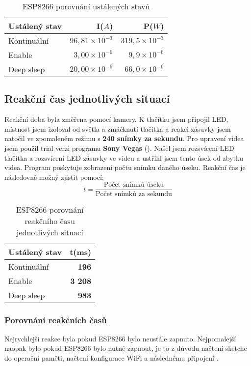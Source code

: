 \documentclass[a4paper, 12pt]{report}
\begin{document}
					\begin{table}[h]
						\centering
						\caption{ESP8266 porovnání ustálených stavů}
						\begin{tabular}{||l|r r||}
							\hline
							Ustálený stav & I($A$) & P($W$)\\
							\hline
							Kontinuální & $96,81 \times 10^{-3}$ & $319,5 \times 10^{-3}$\\
							Enable & $3,00\times 10^{-6}$ & $9,9 \times 10^{-6}$\\
							Deep sleep & $20,00\times 10^{-6}$ & $66,0 \times 10^{-6}$\\
							\hline
						\end{tabular}
						\label{ESP8266 klidové režimy}
					\end{table}

			\subsection{Reakční čas jednotlivých situací}
				Reakční doba byla změřena pomocí kamery. K tlačítku jsem připojil LED, místnost jsem izoloval od světla a zmáčknutí tlačítka a reakci zásuvky jsem natočil ve zpomaleném režimu s {\bf 240 snímky za sekundu}. Pro upravení videa jsem použil trial verzi programu {\bf Sony Vegas} (). Našel jsem rozsvícení LED tlačítka a rozsvícení LED zásuvky ve videu a ustřihl jsem tento úsek od zbytku videa. Program poskytuje zobrazení počtu snímku daného úseku. Reakční čas je následovně možný zjistit pomocí:
				$$ t = \frac{\textrm{Počet snímků úseku}}{\textrm{Počet snímků za sekundu}}$$



				\begin{table}[]
					\centering
					\caption{ESP8266 porovnání reakčního času jednotlivých situací}
					\begin{tabular}{||l|r||}
						\hline
						Ustálený stav & t(ms)\\
						\hline
						Kontinuální & {\bf 196}\\
						Enable & {\bf 3 208}\\
						Deep sleep & {\bf 983}\\
						\hline
					\end{tabular}
					\label{ESP8266 klidové režimy čas}
				\end{table}

				\subsubsection{Porovnání reakčních časů}
					Nejrychlejší reakce byla pokud ESP8266 bylo neustále zapnuto. Nejpomalejší naopak bylo pokud ESP8266 bylo nutné zapnout, je to z důvodu načtení sketche do operační paměti, načtení konfigurace WiFi a následnému připojení .
\end{document}
